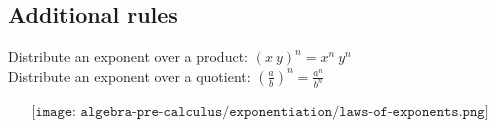 \subsection{Additional rules}
Distribute an exponent over a product: $(x \ y)^{n} = x^{n} \ y^{n}$ \\
Distribute an exponent over a quotient: $  (\frac{a}{b})^{n} = \frac{a^{n}}{b^{n}}$

\begin{align*}
  \texttt{[image: algebra-pre-calculus/exponentiation/laws-of-exponents.png]}
\end{align*}

\newpage